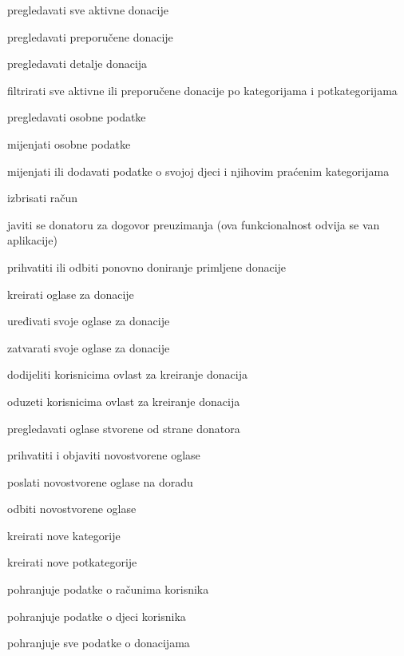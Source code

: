 \begin{packed_enum}
\begin{packed_enum}
					\item pregledavati sve aktivne donacije
					\item pregledavati preporučene donacije
					\item pregledavati detalje donacija
					\item filtrirati sve aktivne ili preporučene donacije po kategorijama i potkategorijama
					\item pregledavati osobne podatke
					\item mijenjati osobne podatke
					\item mijenjati ili dodavati podatke o svojoj djeci i njihovim praćenim kategorijama
					\item izbrisati račun
					\item javiti se donatoru za dogovor preuzimanja (ova funkcionalnost odvija se van aplikacije)
					\item prihvatiti ili odbiti ponovno doniranje primljene donacije
					\item kreirati oglase za donacije
					\item uređivati svoje oglase za donacije 
					\item zatvarati svoje oglase za donacije
					
				\end{packed_enum}

				\item  {}
				
				\begin{packed_enum}
					
					\item dodijeliti korisnicima ovlast za kreiranje donacija
					\item oduzeti korisnicima ovlast za kreiranje donacija
					\item pregledavati oglase stvorene od strane donatora
					\item prihvatiti i objaviti novostvorene oglase
					\item poslati novostvorene oglase na doradu
					\item odbiti novostvorene oglase
					\item kreirati nove kategorije
					\item kreirati nove potkategorije
					
				\end{packed_enum}

				\item  {}
				
				\begin{packed_enum}
					
					\item pohranjuje podatke o računima korisnika
					\item pohranjuje podatke o djeci korisnika
					\item pohranjuje sve podatke o donacijama
					
				\end{packed_enum}
			\end{packed_enum}
			
